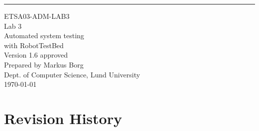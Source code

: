 \documentclass{scrreprt}
\date{}
\def\myversion{1.6 }
\begin{document}
\begin{flushright}
    \rule{16cm}{5pt}\vskip1cm
    \begin{bfseries}
    	\LARGE{ETSA03-ADM-LAB3}\\
    	\vspace{1.5cm}
        \Huge{Lab 3}\\
        \vspace{0.5cm}
        Automated system testing\\
        \vspace{0.5cm}
        with RobotTestBed\\
        \vspace{1.5cm}
        \LARGE{Version \myversion approved}\\
        \vspace{1.5cm}
        Prepared by Markus Borg\\
        Dept. of Computer Science, Lund University\\
        \vspace{1.5cm}
        \today\\
    \end{bfseries}
\end{flushright}


\chapter*{Revision History}
\end{document}
